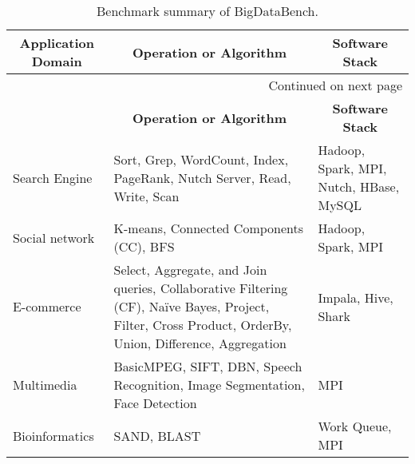 \begin{longtable}{|l|X|X|}
\caption{Benchmark summary of BigDataBench.} \label{tab:bigdatabench} \\

\hline 
\endfirsthead

\hline
\multicolumn{1}{|c|}{\textbf{Application Domain}} & \multicolumn{1}{c|}{\textbf{Operation or Algorithm}} & \multicolumn{1}{c|}{\textbf{Software Stack}}\\
\hline 
\endhead

\hline \multicolumn{3}{|r|}{{Continued on next page}} \\ \hline
\endfoot

\hline
\endlastfoot

\multicolumn{1}{|c|}{\textbf{Application Domain}} & \multicolumn{1}{c|}{\textbf{Operation or Algorithm}} & \multicolumn{1}{c|}{\textbf{Software Stack}}\\ \hline


{Search Engine} & {Sort, Grep, WordCount, Index, PageRank, Nutch Server, Read, Write, Scan} & {Hadoop, Spark, MPI, Nutch, HBase, MySQL} \\ \hline

{Social network} & {K-means, Connected Components (CC), BFS} & {Hadoop, Spark, MPI} \\ \hline

{E-commerce} & {Select, Aggregate, and Join queries, Collaborative Filtering (CF), Naïve Bayes, Project, Filter, Cross Product, OrderBy, Union, Difference, Aggregation} & {Impala, Hive, Shark} \\ \hline

{Multimedia} & {BasicMPEG, SIFT, DBN, Speech Recognition, Image Segmentation, Face Detection} & {MPI} \\ \hline

{Bioinformatics} & {SAND, BLAST} & {Work Queue, MPI} \\ \hline
\end{longtable}